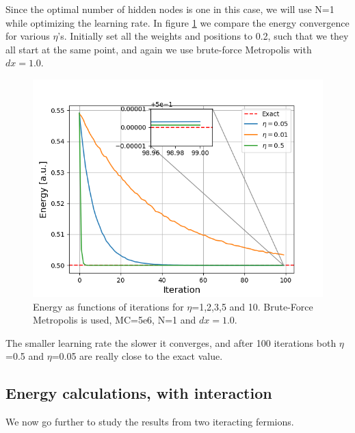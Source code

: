 \documentclass[norsk,a4paper,12pt]{article}
\begin{document}
Since the optimal number of hidden nodes is one in this case, we will use N=1 while optimizing the learning rate. In figure \ref{fig:compare_etas} we compare the energy convergence for various $\eta$'s.  Initially set all the weights and positions to 0.2, such that we they all start at the same point, and again we use brute-force Metropolis with $dx=1.0$.

 \begin{figure} [H]
 	\centering
 	\includegraphics[scale=0.8]{plots/energy_compare_eta.png}
 	\caption{Energy as functions of iterations for $\eta$=1,2,3,5 and 10. Brute-Force Metropolis is used, MC=5e6, N=1 and $dx=1.0$.}
 	\label{fig:compare_etas}
 \end{figure}
The smaller learning rate the slower it converges, and after 100 iterations both $\eta$=0.5 and $\eta$=0.05 are really close to the exact value. 

\subsection{Energy calculations, with interaction}
We now go further to study the results from two iteracting fermions. 
\end{document}
